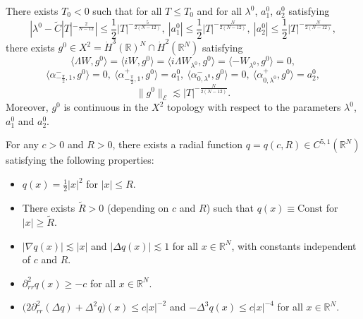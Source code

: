 \documentclass[10pt,a4paper]{amsart}
\newcommand{\R}{\mathbb{R}}
\begin{document}
\begin{lem}
\label{lemcondinit}
There exists $T_0<0$ such that for all $T\leq T_0$ and for all $\lambda^0$, $a_1^0$, $a_2^0$ satisfying
\begin{equation}
\label{condinit}
|\lambda^0 - \tilde{C} |T|^{-\frac{2}{N-12}}|\leq \frac{1}{2} |T|^{-\frac{5}{2(N-12)}},\ |a_1^0|\leq \frac{1}{2} |T|^{-\frac{N}{2(N-12)}},\ |a_2^0|\leq \frac{1}{2} |T|^{-\frac{N}{2(N-12)}},
\end{equation}
there exists $g^0 \in X^2 = \dot{H}^3 (\R)^N \cap \dot{H}^2 (\R^N)$ satisfying
\begin{equation}\label{4-2}
\langle \Lambda W , g^0\rangle = \langle iW , g^0\rangle = \langle i \Lambda W_{\lambda^0},g^0 \rangle = \langle - W_{\lambda^0}, g^0\rangle =0,
\end{equation}
\begin{equation}\label{4-3}
\langle \alpha^-_{-\frac{\pi}{2},1} , g^0 \rangle =0,\ \langle \alpha^+_{-\frac{\pi}{2},1}, g^0 \rangle = a_1^0 ,\ \langle \alpha_{0,\lambda^0}^- , g^0 \rangle =0 ,\ \langle \alpha_{0,\lambda^0}^+,g^0 \rangle = a_2^0,
\end{equation}
\begin{equation}
\label{eqg0}
\|g^0\|_{\mathcal{E}} \lesssim |T|^{-\frac{N}{2(N-12)}} .
\end{equation}
Moreover, $g^0$ is continuous in the $X^2$ topology with respect to the parameters $\lambda^0$, $a_1^0$ and $a_2^0$.
\end{lem}

\begin{lem}
\label{lemconsq}
For any $c>0$ and $R>0$, there exists a radial function $q=q(c,R) \in C^{5,1} (\R^N)$ satisfying the following properties:
\begin{itemize}
\item[(1)] $q(x)= \frac{1}{2} |x|^2$ for $|x|\leq R$.
\item[(2)] There exists $\tilde{R}>0$ (depending on $c$ and $R$) such that $q(x) \equiv \text{Const}$ for $|x|\geq \tilde{R}$.
\item[(3)] $|\nabla q (x)|\lesssim |x|$ and $|\Delta q(x) | \lesssim 1 $ for all $x\in \R^N$, with constants independent of $c$ and $R$.
\item[(4)] $\partial_{rr}^2 q(x) \geq - c$ for all $x\in \R^N$. %
\item[(5)] $\big(2\partial_{rr}^2(\Delta q)+\Delta^2 q\big)(x) \leq c |x|^{-2}$ and $-\Delta^3 q (x) \leq c |x|^{-4} $  for all $x\in \R^N$.
\end{itemize}
\end{lem}
\end{document}
